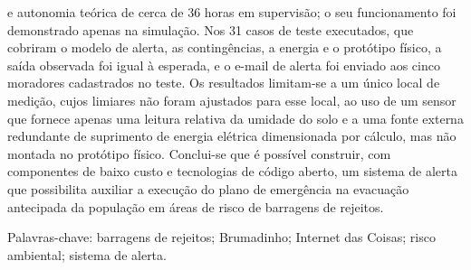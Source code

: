 \begin{resumo}
\begin{SingleSpace}
e autonomia teórica de cerca de 36 horas em supervisão; o seu funcionamento foi demonstrado apenas na
simulação. Nos 31 casos de teste executados, que cobriram o modelo de
alerta, as contingências, a energia e o protótipo físico, a saída
observada foi igual à esperada, e o e-mail de alerta foi enviado aos
cinco moradores cadastrados no teste. Os resultados limitam-se a um
único local de medição, cujos limiares não foram ajustados para esse
local, ao uso de um sensor que fornece apenas uma leitura relativa da
umidade do solo e a uma fonte externa redundante de suprimento de energia elétrica
dimensionada por cálculo, mas não montada no protótipo físico.
Conclui-se que é possível construir, com componentes de baixo custo e
tecnologias de código aberto, um sistema de alerta que possibilita auxiliar a
execução do plano de emergência na evacuação antecipada da população em
áreas de risco de barragens de rejeitos.

\vspace{\onelineskip}
\noindent Palavras-chave: barragens de rejeitos; Brumadinho; Internet das Coisas; risco ambiental; sistema de alerta.

\end{SingleSpace}
\end{resumo}
